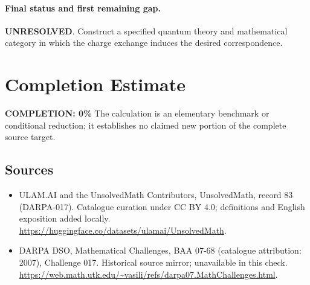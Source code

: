\documentclass[11pt]{article}
\begin{document}
\paragraph{Final status and first remaining gap.}
\textbf{UNRESOLVED}. Construct a specified quantum theory and mathematical category in which the charge exchange induces the desired correspondence.

\section{Completion Estimate}
\noindent\textbf{COMPLETION: 0\%}
The calculation is an elementary benchmark or conditional reduction; it establishes no claimed new portion of the complete source target.

\subsection{Sources}
\begin{itemize}
\item[\hypertarget{source:83:1}{S1}] ULAM.AI and the UnsolvedMath Contributors, UnsolvedMath, record 83 (DARPA-017). Catalogue curation under CC BY 4.0; definitions and English exposition added locally.
\url{https://huggingface.co/datasets/ulamai/UnsolvedMath}.
\item[\hypertarget{source:83:2}{S2}] DARPA DSO, Mathematical Challenges, BAA 07-68 (catalogue attribution: 2007), Challenge 017. Historical source mirror; unavailable in this check.
\url{https://web.math.utk.edu/~vasili/refs/darpa07.MathChallenges.html}.
\end{itemize}
\label{end:83}
\end{document}
